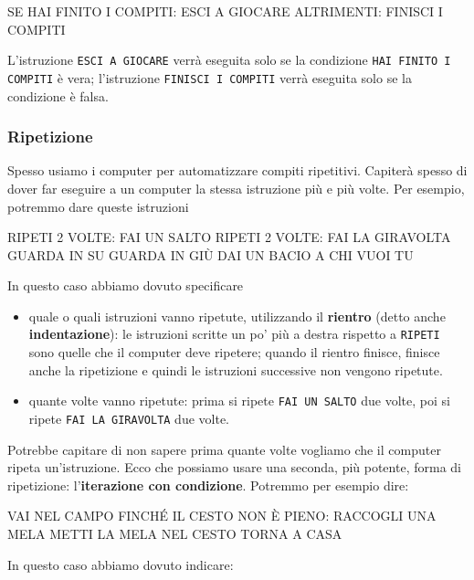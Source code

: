 \begin{pseudocodice}
SE HAI FINITO I COMPITI:
    ESCI A GIOCARE
ALTRIMENTI:
    FINISCI I COMPITI
\end{pseudocodice}

L'istruzione \texttt{ESCI A GIOCARE} verrà eseguita solo se la condizione \texttt{HAI FINITO I COMPITI} è vera; l'istruzione \texttt{FINISCI I COMPITI} verrà eseguita solo se la condizione è falsa.


\subsubsection{Ripetizione}

Spesso usiamo i computer per automatizzare compiti ripetitivi. Capiterà spesso di dover far eseguire a un computer la stessa istruzione più e più volte. Per esempio, potremmo dare queste istruzioni

\begin{pseudocodice}
RIPETI 2 VOLTE:
    FAI UN SALTO
RIPETI 2 VOLTE:
    FAI LA GIRAVOLTA
GUARDA IN SU
GUARDA IN GIÙ
DAI UN BACIO A CHI VUOI TU
\end{pseudocodice}

\noindent In questo caso abbiamo dovuto specificare

\begin{itemize}
\item
  quale o quali istruzioni vanno ripetute, utilizzando il \textbf{rientro} (detto anche \textbf{indentazione}): le istruzioni scritte un po' più a destra rispetto a \texttt{RIPETI} sono quelle che il computer deve ripetere; quando il rientro finisce, finisce anche la ripetizione e quindi le istruzioni successive non vengono ripetute.
\item
  quante volte vanno ripetute: prima si ripete \texttt{FAI UN SALTO} due volte, poi si ripete \texttt{FAI LA GIRAVOLTA} due volte.
\end{itemize}

Potrebbe capitare di non sapere prima quante volte vogliamo che il computer ripeta un'istruzione. Ecco che possiamo usare una seconda, più potente, forma di ripetizione: l'\textbf{iterazione con condizione}. Potremmo per esempio dire:

\begin{pseudocodice}
VAI NEL CAMPO
FINCHÉ IL CESTO NON È PIENO:
    RACCOGLI UNA MELA
    METTI LA MELA NEL CESTO
TORNA A CASA
\end{pseudocodice}

\noindent In questo caso abbiamo dovuto indicare:

